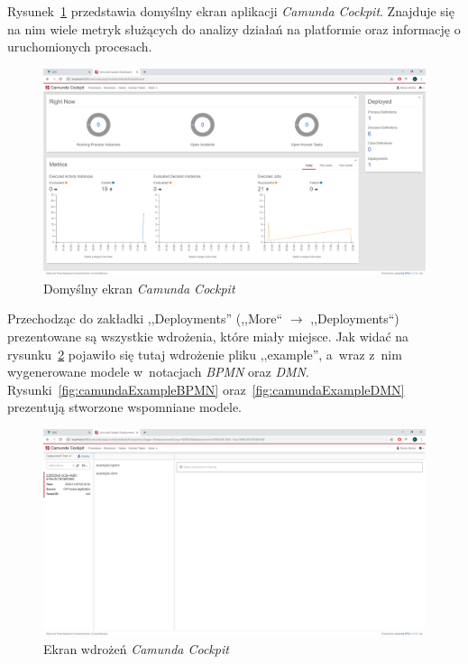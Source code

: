 Rysunek~\ref{fig:camundaCockpitDefault} przedstawia domyślny ekran aplikacji \emph{Camunda Cockpit}. Znajduje się na nim wiele metryk służących do analizy działań na platformie oraz informację o uruchomionych procesach.
\begin{figure}
    \centering
    \includegraphics[width=\textwidth]{./assets/camundaCockpitDefault.png}
    \caption{Domyślny ekran \emph{Camunda Cockpit}}
    \label{fig:camundaCockpitDefault}
\end{figure}
Przechodząc do zakładki ,,Deployments'' (,,More`` $\rightarrow$ ,,Deployments``) prezentowane są wszystkie wdrożenia, które miały miejsce. Jak widać na rysunku~\ref{fig:camundaCockpitDeployments} pojawiło się tutaj wdrożenie pliku ,,example'', a~wraz z~nim wygenerowane modele w~notacjach \emph{BPMN} oraz \emph{DMN}. Rysunki~\ref{fig:camundaExampleBPMN} oraz~\ref{fig:camundaExampleDMN} prezentują stworzone wspomniane modele.
\begin{figure}
    \centering
    \includegraphics[width=\textwidth]{./assets/camundaCockpitDeployments.png}
    \caption{Ekran wdrożeń \emph{Camunda Cockpit}}
    \label{fig:camundaCockpitDeployments}
\end{figure}
